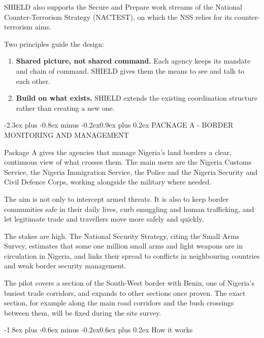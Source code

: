\documentclass[10pt,letterpaper]{article}
\makeatletter
\renewcommand\section{\@startsection{section}{1}{0pt}%
  {-2.3ex plus -0.8ex minus -0.2ex}{0.9ex plus 0.2ex}%
  {\color{SDSSNavy}\large\bfseries}}
\renewcommand\subsection{\@startsection{subsection}{2}{0pt}%
  {-1.8ex plus -0.6ex minus -0.2ex}{0.6ex plus 0.2ex}%
  {\color{SDSSNavy}\normalsize\bfseries}}
\makeatother
\begin{document}
SHIELD also supports the Secure and Prepare work streams of the National Counter-Terrorism Strategy (NACTEST), on which the NSS relies for its counter-terrorism aims.

Two principles guide the design:

\begin{enumerate}[label=\alph*.,leftmargin=2em,itemsep=5pt]
  \item \textbf{Shared picture, not shared command.} Each agency keeps its mandate and chain of command. SHIELD gives them the means to see and talk to each other.
  \item \textbf{Build on what exists.} SHIELD extends the existing coordination structure rather than creating a new one.
\end{enumerate}

\section{PACKAGE A - BORDER MONITORING AND MANAGEMENT}

Package A gives the agencies that manage Nigeria's land borders a clear, continuous view of what crosses them. The main users are the Nigeria Customs Service, the Nigeria Immigration Service, the Police and the Nigeria Security and Civil Defence Corps, working alongside the military where needed.

The aim is not only to intercept armed threats. It is also to keep border communities safe in their daily lives, curb smuggling and human trafficking, and let legitimate trade and travellers move more safely and quickly.

The stakes are high. The National Security Strategy, citing the Small Arms Survey, estimates that some one million small arms and light weapons are in circulation in Nigeria, and links their spread to conflicts in neighbouring countries and weak border security management.

The pilot covers a section of the South-West border with Benin, one of Nigeria's busiest trade corridors, and expands to other sections once proven. The exact section, for example along the main road corridors and the bush crossings between them, will be fixed during the site survey.

\subsection{How it works}
\end{document}
